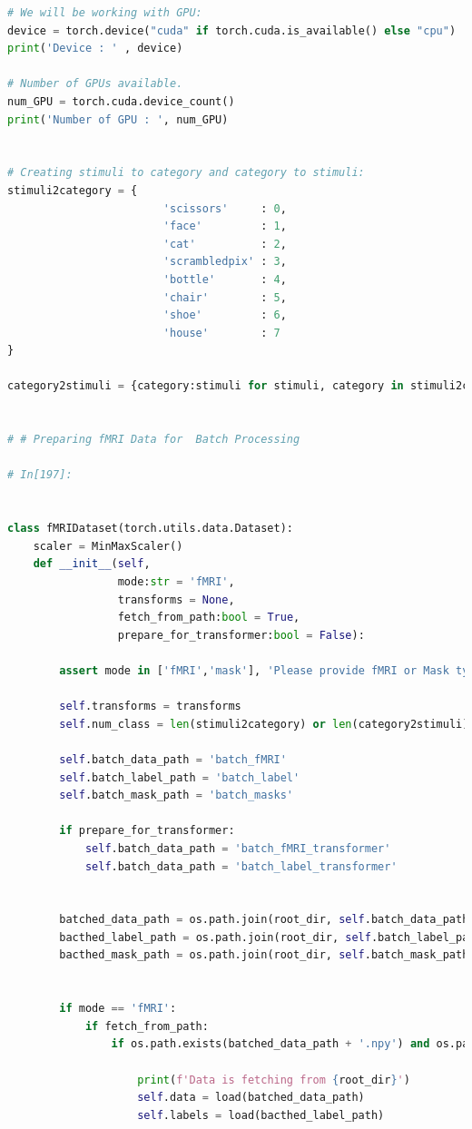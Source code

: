 \documentclass[10pt, twocolumn, letterpaper]{article}
\begin{document}
\begin{lstlisting}[language=Python]
# We will be working with GPU:
device = torch.device("cuda" if torch.cuda.is_available() else "cpu")
print('Device : ' , device)

# Number of GPUs available. 
num_GPU = torch.cuda.device_count()
print('Number of GPU : ', num_GPU)


# Creating stimuli to category and category to stimuli:
stimuli2category = {
                        'scissors'     : 0,
                        'face'         : 1, 
                        'cat'          : 2,
                        'scrambledpix' : 3,
                        'bottle'       : 4,
                        'chair'        : 5,
                        'shoe'         : 6,
                        'house'        : 7
}

category2stimuli = {category:stimuli for stimuli, category in stimuli2category.items()}


# # Preparing fMRI Data for  Batch Processing

# In[197]:


class fMRIDataset(torch.utils.data.Dataset):
    scaler = MinMaxScaler()
    def __init__(self, 
                 mode:str = 'fMRI',
                 transforms = None,
                 fetch_from_path:bool = True,
                 prepare_for_transformer:bool = False):
        
        assert mode in ['fMRI','mask'], 'Please provide fMRI or Mask type of mode!'
        
        self.transforms = transforms
        self.num_class = len(stimuli2category) or len(category2stimuli)

        self.batch_data_path = 'batch_fMRI'
        self.batch_label_path = 'batch_label'
        self.batch_mask_path = 'batch_masks'
        
        if prepare_for_transformer:
            self.batch_data_path = 'batch_fMRI_transformer'
            self.batch_data_path = 'batch_label_transformer'

        
        batched_data_path = os.path.join(root_dir, self.batch_data_path)
        bacthed_label_path = os.path.join(root_dir, self.batch_label_path)  
        bacthed_mask_path = os.path.join(root_dir, self.batch_mask_path)  
        
        
        if mode == 'fMRI':            
            if fetch_from_path: 
                if os.path.exists(batched_data_path + '.npy') and os.path.exists(bacthed_label_path  + '.npy'):   
                    
                    print(f'Data is fetching from {root_dir}')
                    self.data = load(batched_data_path)
                    self.labels = load(bacthed_label_path)   
                    

\end{lstlisting}
\end{document}
